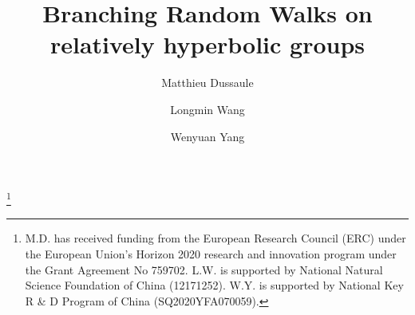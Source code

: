 \documentclass{amsart}
\theoremstyle{definition}
\theoremstyle{remark}
\begin{document}
\title{Branching Random Walks on relatively hyperbolic groups}

 
\author{Matthieu Dussaule}
\address{Matthieu Dussaule : D\'epartement de math\'ematiques, Facult\'e des Sciences Batiment I,
2 Boulevard Lavoisier
49045 Angers cedex 01}

\author{Longmin Wang}
\address{Longmin Wang : School of Statistics and Data Science, LPMC, Nankai University, 94 Weijin Road, Nankai District, Tianjin, China }

\author{Wenyuan Yang}
\address{Wenyuan Yang : Beijing International Center for Mathematical Research (BICMR), Beijing University, No. 5 Yiheyuan Road, Haidian District, Beijing, China}
 

\thanks{M.D.   has received funding from the European Research Council  (ERC) under the European Union's Horizon 2020 research and innovation  program under the Grant Agreement No 759702. L.W. is supported by National Natural Science Foundation of China (12171252).  W.Y. is supported by National Key R \& D Program of China (SQ2020YFA070059).}




\dedicatory{}

\end{document}
